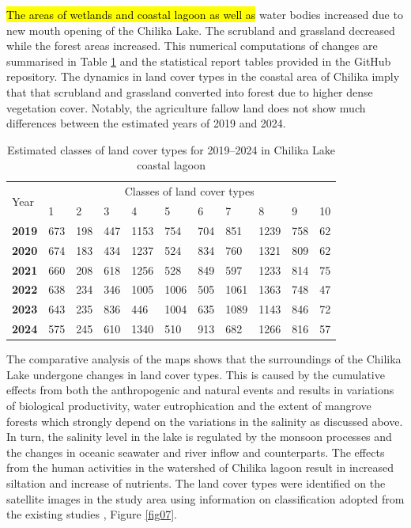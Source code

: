 \documentclass[jmse,article,submit,pdftex,moreauthors]{Definitions/mdpi}
\begin{document}
\hl{The areas of wetlands and coastal lagoon as well as} water bodies increased due to new mouth opening of the Chilika Lake. The scrubland and grassland decreased while the forest areas increased. This numerical computations of changes are summarised in Table \ref{tab01} and the statistical report tables provided in the GitHub repository. The dynamics in land cover types in the coastal area of Chilika imply that that scrubland and grassland converted into forest due to higher dense vegetation cover. Notably, the agriculture fallow land does not show much differences between the estimated years of 2019 and 2024.

\begin{table}[H]
  \centering
  \begin{tabularx}{\textwidth}{p{0.9cm}p{0.9cm}p{0.9cm}p{0.9cm}p{0.9cm}p{0.9cm}p{0.9cm}p{0.9cm}p{0.9cm}p{0.9cm}p{0.9cm}}
  \toprule
  \multirow{2}{*}{Year} & \multicolumn{10}{c}{Classes of land cover types} \\
     & 1 & 2 & 3 & 4 & 5 & 6 & 7 & 8 & 9 & 10 \\
    \midrule
    \textbf{2019} & 673 & 198 & 447 & 1153 & 754 & 704 & 851 & 1239 & 758 & 62 \\
    \textbf{2020} & 674 & 183 & 434 & 1237 & 524 & 834 & 760 & 1321 & 809 & 62 \\
    \textbf{2021} & 660 & 208 & 618 & 1256 & 528 & 849 & 597 & 1233 & 814 & 75 \\
    \textbf{2022} & 638 & 234 & 346 & 1005 & 1006 & 505 & 1061 & 1363 & 748 & 47 \\
     \textbf{2023} & 643 & 235 & 836 & 446 & 1004 & 635 & 1089 & 1143 & 846 & 72 \\
    \textbf{2024}  & 575 & 245 & 610 & 1340 & 510 & 913 & 682 & 1266 & 816 & 57 \\
\bottomrule
\end{tabularx}
  \caption{Estimated classes of land cover types for 2019--2024 in Chilika Lake coastal lagoon}
  \label{tab01}
\end{table}

The comparative analysis of the maps shows that the surroundings of the Chilika Lake undergone changes in land cover types. This is caused by the cumulative effects from both the anthropogenic and natural events and results in variations of biological productivity, water eutrophication and the extent of mangrove forests which strongly depend on the variations in the salinity as discussed above. In turn, the salinity level in the lake is regulated by the monsoon processes and the changes in oceanic seawater and river inflow and counterparts. The effects from the human activities in the watershed of Chilika lagoon result in increased siltation and increase of nutrients. The land cover types were identified on the satellite images in the study area using information on classification adopted from the existing studies \cite{Behera2023}, Figure \ref{fig07}. 
\end{document}
